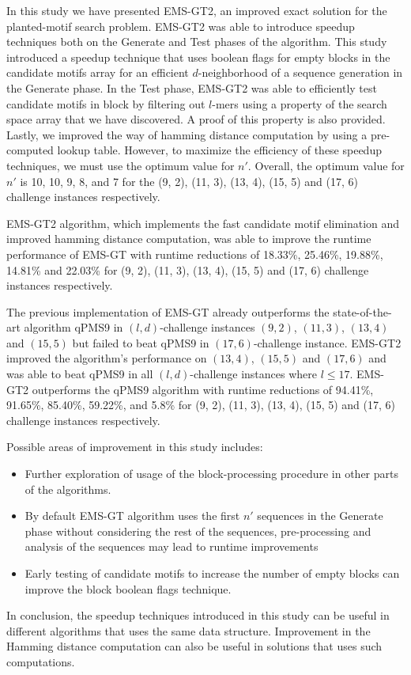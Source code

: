 
In this study we have presented EMS-GT2, an improved exact solution for the planted-motif search problem. EMS-GT2 was able to introduce speedup techniques both on the Generate and Test phases of the algorithm. This study introduced a speedup technique that uses boolean flags for empty blocks in the candidate motifs array for an efficient $d$-neighborhood of a sequence generation in the Generate phase. In the Test phase, EMS-GT2 was able to efficiently test candidate motifs in block by filtering out $l$-mers using a property of the search space array that we have discovered. A proof of this property is also provided. Lastly, we improved the way of hamming distance computation by using a pre-computed lookup table. However, to maximize the efficiency of these speedup techniques, we must use the optimum value for $n'$. Overall, the optimum value for $n'$ is 10, 10, 9, 8, and 7 for the (9, 2), (11, 3), (13, 4), (15, 5) and (17, 6) challenge instances respectively.

EMS-GT2 algorithm, which implements the fast candidate motif elimination and improved hamming distance computation, was able to improve the runtime performance of EMS-GT with runtime reductions of 18.33\%, 25.46\%, 19.88\%, 14.81\% and 22.03\% for (9, 2), (11, 3), (13, 4), (15, 5) and (17, 6) challenge instances respectively.

The previous implementation of EMS-GT already outperforms the state-of-the-art algorithm qPMS9 in $(l, d)$-challenge instances $(9, 2)$, $(11, 3)$, $(13, 4)$ and $(15, 5)$ but failed to beat qPMS9 in $(17, 6)$-challenge instance. EMS-GT2 improved the algorithm's performance on $(13, 4)$, $(15, 5)$ and $(17, 6)$ and was able to beat qPMS9 in all $(l, d)$-challenge instances where $l \leq 17$. EMS-GT2 outperforms the qPMS9 algorithm with runtime reductions of 94.41\%, 91.65\%, 85.40\%, 59.22\%, and 5.8\% for (9, 2), (11, 3), (13, 4), (15, 5) and (17, 6) challenge instances respectively.

Possible areas of improvement in this study includes:

\begin{itemize}

\item Further exploration of usage of the block-processing procedure in other parts of the algorithms.

\item By default EMS-GT algorithm uses the first $n'$ sequences in the Generate phase without considering the rest of the sequences, pre-processing and analysis of the sequences may lead to runtime improvements

\item Early testing of candidate motifs to increase the number of empty blocks can improve the block boolean flags technique. 

\end{itemize}

In conclusion, the speedup techniques introduced in this study can be useful in different algorithms that uses the same data structure. Improvement in the Hamming distance computation can also be useful in solutions that uses such computations.

